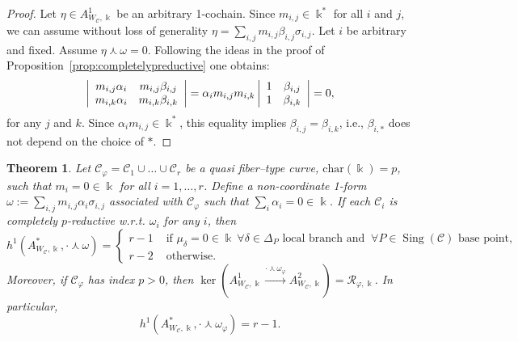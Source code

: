 \documentclass[11pt]{amsart}
\DeclareMathOperator{\Sing}{Sing}
\def\cC{\mathcal{C}}
\def\cR{{\mathcal R}}
\def\kk{\Bbbk}
\def\w{\omega}
\theoremstyle{plain}
\newtheorem{theorem}[thm]{Theorem}
\theoremstyle{definition}
\begin{document}
\begin{proof}
Let  $\eta \in A^1_{W_\cC,\kk}$ be an arbitrary 1-cochain. Since $m_{i,j}\in\kk^*$ for all $i$ and $j$, we can assume without loss of generality 
$\eta = \sum_{i,j} m_{i,j} \beta_{i,j}\sigma_{i,j}$. Let $i$ be arbitrary and fixed. 
Assume $\eta \curlywedge \w=0$. Following the ideas in the proof of Proposition~\ref{prop:completelypreductive} one obtains:
$$
\left|
\array{cc}
m_{i,j} \alpha_{i}& m_{i,j} \beta_{i,j}\\
m_{i,k} \alpha_{i}& m_{i,k} \beta_{i,k}
\endarray
\right|= 
\alpha_im_{i,j}m_{i,k}
\left|
\array{cc}
1& \beta_{i,j}\\
1& \beta_{i,k}
\endarray
\right| =
0,
$$
for any $j$ and $k$. Since $\alpha_im_{i,j}\in\kk^*$, this equality implies $\beta_{i,j} = \beta_{i,k}$, i.e., $\beta_{i,*}$ does not depend on the choice of $*$.
\end{proof}

\begin{theorem}
\label{thm:p.index}
Let $\cC_\varphi=\cC_1\cup\dots\cup\cC_r$ be a quasi fiber--type curve, $\mathrm{char}(\kk)=p$, such that $m_i=0\in\kk$ for all $i=1,\ldots,r$. 
Define a non-coordinate 1-form $\w:=\sum_{i,j} m_{i,j}\alpha_i\sigma_{i,j}$ associated with $\cC_\varphi$ such that $\sum_i\alpha_i=0\in\kk$. If each $\cC_i$ is completely $p$-reductive w.r.t. $\w_i$ for any $i$, then
$$h^1(A^*_{W_\cC,\kk},\cdot\curlywedge\w)=
\begin{cases}
r-1 & \textrm{ if } \mu_\delta=0\in\kk\ \forall\delta\in\Delta_P \textrm{ local branch and }\ \forall P\in\Sing(\cC) \textrm{ base point,}\\
r-2 & \textrm{ otherwise.}
\end{cases}
$$
Moreover, if $\cC_\varphi$ has index $p>0$, then 
$\ker(A^1_{W_\cC,\kk}\xrightarrow{\cdot\curlywedge\w_\varphi} A^2_{W_\cC,\kk})=\cR_{\varphi,\kk}$.
In particular,
$$h^1(A^*_{W_\cC,\kk},\cdot\curlywedge\w_\varphi)= r-1.$$
\end{theorem}
\end{document}

